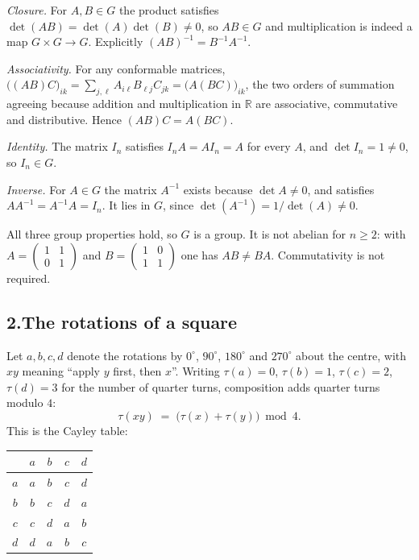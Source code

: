 \documentclass[11pt]{article}
\theoremstyle{definition}\newtheorem*{definition}{Definition}
\theoremstyle{definition}
\begin{document}
\emph{Closure.} For $A, B \in G$ the product satisfies
$\det(AB) = \det(A)\det(B) \ne 0$, so $AB \in G$ and multiplication is
indeed a map $G \times G \to G$. Explicitly $(AB)^{-1} = B^{-1}A^{-1}$.

\emph{Associativity.} For any conformable matrices,
$\big((AB)C\big)_{ik} = \sum_{j,\ell} A_{i\ell} B_{\ell j} C_{jk}
= \big(A(BC)\big)_{ik}$, the two orders of summation agreeing because
addition and multiplication in $\mathbb{R}$ are associative,
commutative and distributive. Hence $(AB)C = A(BC)$.

\emph{Identity.} The matrix $I_n$ satisfies $I_n A = A I_n = A$ for every
$A$, and $\det I_n = 1 \ne 0$, so $I_n \in G$.

\emph{Inverse.} For $A \in G$ the matrix $A^{-1}$ exists because
$\det A \ne 0$, and satisfies $A A^{-1} = A^{-1} A = I_n$. It lies in
$G$, since $\det(A^{-1}) = 1/\det(A) \ne 0$.

All three group properties hold, so $G$ is a group. It is not abelian
for $n \ge 2$: with
$A = \left(\begin{smallmatrix}1&1\\0&1\end{smallmatrix}\right)$ and
$B = \left(\begin{smallmatrix}1&0\\1&1\end{smallmatrix}\right)$ one has
$AB \ne BA$. Commutativity is not required.

\subsection*{2.\quad The rotations of a square}

Let $a, b, c, d$ denote the rotations by $0^{\circ}$, $90^{\circ}$,
$180^{\circ}$ and $270^{\circ}$ about the centre, with $xy$ meaning
``apply $y$ first, then $x$''. Writing $\tau(a) = 0$, $\tau(b) = 1$,
$\tau(c) = 2$, $\tau(d) = 3$ for the number of quarter turns, composition
adds quarter turns modulo $4$:
\begin{equation}
  \tau(xy) \;=\; \big(\tau(x) + \tau(y)\big) \bmod 4 .
  \label{eq:rot}
\end{equation}
This is the Cayley table:

\begin{center}
\begin{tabular}{@{}c|cccc@{}}
\toprule
 & $a$ & $b$ & $c$ & $d$ \\
\midrule
$a$ & $a$ & $b$ & $c$ & $d$ \\
$b$ & $b$ & $c$ & $d$ & $a$ \\
$c$ & $c$ & $d$ & $a$ & $b$ \\
$d$ & $d$ & $a$ & $b$ & $c$ \\
\bottomrule
\end{tabular}
\end{center}
\end{document}
